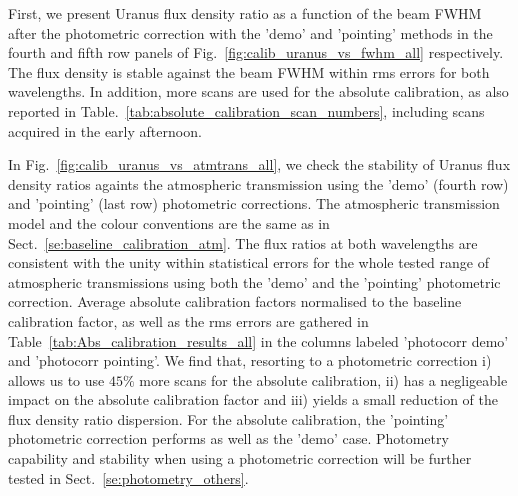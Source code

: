 First, we present Uranus flux density ratio as a function of the beam FWHM
after the photometric correction with the 'demo' and 'pointing'
methods in the fourth and fifth row panels of
Fig.~\ref{fig:calib_uranus_vs_fwhm_all} respectively. The flux density
is stable against the beam FWHM within rms errors for both
wavelengths. In addition, more scans are used for the absolute
calibration, as also reported in
Table.~\ref{tab:absolute_calibration_scan_numbers}, including scans
acquired in the early afternoon.

In Fig.~\ref{fig:calib_uranus_vs_atmtrans_all}, we check the stability
of Uranus flux density ratios againts the atmospheric transmission using
the 'demo' (fourth row) and 'pointing' (last row) photometric
corrections. The atmospheric transmission model and the colour
conventions are the same as in Sect.~\ref{se:baseline_calibration_atm}.
The flux ratios at both wavelengths are consistent with the
unity within statistical errors for the whole tested range of
atmospheric transmissions using both the 'demo' and the 'pointing'
photometric correction. Average absolute calibration factors normalised
to the baseline calibration factor, as well as the rms errors are
gathered in Table~\ref{tab:Abs_calibration_results_all} in the columns
labeled 'photocorr demo' and 'photocorr pointing'. We find that,
resorting to a photometric correction i) allows us to use $45\%$ more
scans for the absolute calibration, ii) has a negligeable impact on
the absolute calibration factor and iii) yields a small reduction of
the flux density ratio dispersion. For the absolute calibration, the
'pointing' photometric correction performs as well as the 'demo' case.
Photometry capability and stability when using a photometric
correction will be further tested in Sect.~\ref{se:photometry_others}. 




